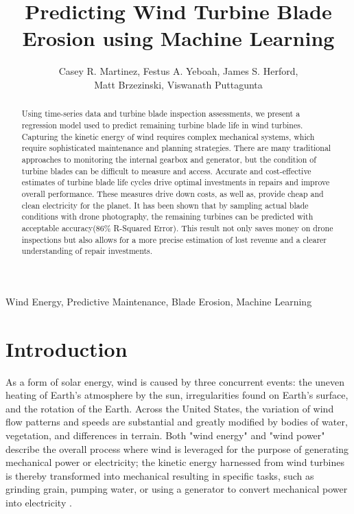 \documentclass[runningheads]{llncs}
\title{Predicting Wind Turbine Blade Erosion using Machine Learning }
\author{Casey R. Martinez, Festus A. Yeboah, James S. Herford,\\ Matt Brzezinski, Viswanath Puttagunta}
\institute{$^1$Master of Science in Data Science \\ Southern Methodist University \\ Dallas, Texas USA \\ 
\email{\{casianom,fasareyeboah,jherford\}@smu.edu, matt.brzezinski@patternenergy.com,
vish@divergence.ai}}
\begin{document}
\maketitle 

\begin{abstract} 
Using time-series data and turbine blade inspection assessments, we present a regression model used to predict remaining turbine blade life in wind turbines. Capturing the kinetic energy of wind requires complex mechanical systems, which require sophisticated maintenance and planning strategies. There are many traditional approaches to monitoring the internal gearbox and generator, but the condition of turbine blades can be difficult to measure and access. Accurate and cost-effective estimates of turbine blade life cycles drive optimal investments in repairs and improve overall performance. These measures drive down costs, as well as, provide cheap and clean electricity for the planet. It has been shown that by sampling actual blade conditions with drone photography, the remaining turbines can be predicted with acceptable accuracy(86\% R-Squared Error). This result not only saves money on drone inspections but also allows for a more precise estimation of lost revenue and a clearer understanding of repair investments. 
 
\end{abstract} 

\begin{keywords} 
Wind Energy, Predictive Maintenance, Blade Erosion, Machine Learning 
\end{keywords} 

\section{Introduction} 
As a form of solar energy, wind is caused by three concurrent events: the uneven heating of Earth's atmosphere by the sun, irregularities found on Earth's surface, and the rotation of the Earth. Across the United States, the variation of wind flow patterns and speeds are substantial and greatly modified by bodies of water, vegetation, and differences in terrain. Both "wind energy" and "wind power" describe the overall process where wind is leveraged for the purpose of generating mechanical power or electricity; the kinetic energy harnessed from wind turbines is thereby transformed into mechanical resulting in specific tasks, such as grinding grain, pumping water, or using a generator to convert mechanical power into electricity \cite{Turbines}.
\end{document}
